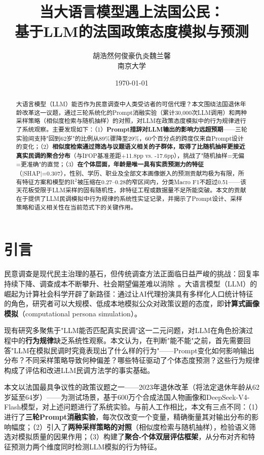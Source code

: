 \documentclass[11pt,a4paper]{ctexart}
\title{\textbf{当大语言模型遇上法国公民：\\基于LLM的法国政策态度模拟与预测}}
\author{
    \large 胡浩然\quad 何俊豪\quad 仇炎\quad 魏兰馨\\
    \normalsize 南京大学
}
\date{\today}
\begin{document}
\maketitle

\begin{abstract}
大语言模型（LLM）能否作为民意调查中人类受访者的可信代理？本文围绕法国退休年龄改革这一议题，通过三轮系统化的Prompt消融实验（累计30,000次LLM调用）和两种采样策略（相似度检索与随机抽样）的对照，对LLM在政策态度模拟中的行为规律进行了系统观察。主要发现如下：（1）\textbf{Prompt措辞对LLM输出的影响力远超预期}——三轮实验间支持"回到62岁"的比例从89\%骤降至29\%，60个百分点的跨度仅来自Prompt设计的变化；（2）\textbf{相似度检索通过筛选与议题语义相关的子群体，取得了比随机抽样更接近真实民调的聚合分布}（与IFOP基准差距+11.8pp vs. -17.6pp），挑战了"随机抽样=无偏=更准确"的直觉；（3）\textbf{在个体层面，年龄是唯一具有实质预测力的特征}（|SHAP|=0.307），性别、学历、职业及全部文本画像嵌入的预测贡献均极为有限，所有特征方案和模型的R$^2$被压缩在0.27--0.28的窄区间内，分类Macro F1不超过0.51——该天花板受限于LLM采样的固有随机性，非特征工程或数据量不足所能突破。本文的贡献在于提供了LLM民调模拟中行为规律的系统性实证记录，并揭示了Prompt设计、采样策略和语义相关性在当前范式下的关键作用。
\end{abstract}

\section{引言}

民意调查是现代民主治理的基石，但传统调查方法正面临日益严峻的挑战：回复率持续下降、调查成本不断攀升、社会期望偏差难以消除~\cite{groves2009survey}。大语言模型（LLM）的崛起为计算社会科学开辟了新路径：通过让AI代理扮演具有多样化人口统计特征的角色，研究者可以大规模、低成本地模拟公众对政策议题的态度，即\textbf{计算式画像模拟}（computational persona simulation）。

现有研究多聚焦于"LLM能否匹配真实民调"这一二元问题，对LLM在角色扮演过程中的\textbf{行为规律}缺乏系统性观察。本文认为，在判断"能不能"之前，首先需要回答"LLM在模拟民调时究竟表现出了什么样的行为"——Prompt变化如何影响输出分布？不同采样策略导致何种偏差？哪些特征驱动了个体态度预测？这些行为规律构成了评估和改进LLM民调方法学的事实基础。

本文以法国最具争议性的政策议题之一——2023年退休改革（将法定退休年龄从62岁延至64岁）——为测试场景，基于600万个合成法国人物画像和DeepSeek-V4-Flash模型，对上述问题进行了系统实验。与前人工作相比，本文有三点不同：（1）进行了\textbf{三轮Prompt消融实验}，每次仅改变一个变量，精确衡量其对输出分布的影响幅度；（2）引入了\textbf{两种采样策略的对照}（相似度检索与随机抽样），检验语义筛选对模拟质量的因果作用；（3）构建了\textbf{聚合-个体双层评估框架}，从分布对齐和特征预测力两个维度同时检测LLM模拟的行为特征。
\end{document}
